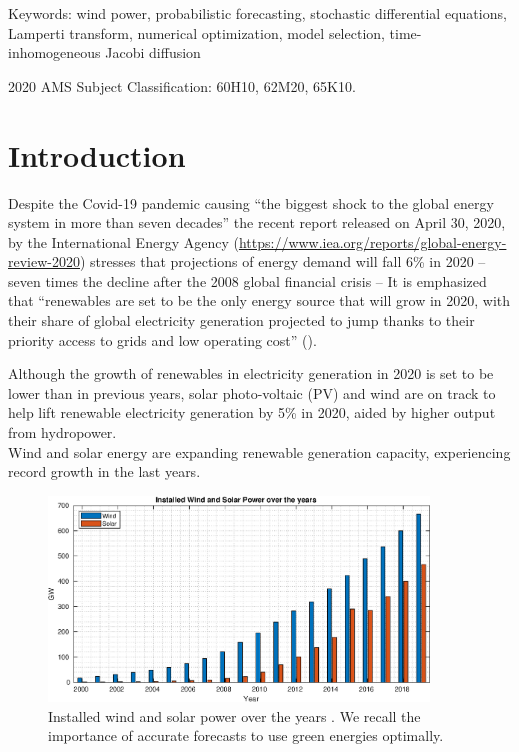 \documentclass[11pt]{article}
\theoremstyle{definition}
\begin{document}
Keywords: wind power, probabilistic forecasting, stochastic differential equations, Lamperti transform, numerical optimization, model selection, time-inhomogeneous Jacobi diffusion

2020 AMS Subject Classification: 60H10, 62M20, 65K10.



\section{Introduction}  \label{Section_1}

Despite the Covid-19 pandemic causing ``the biggest shock to the global energy system in more than seven decades'' the recent report released on April 30, 2020, by the International Energy Agency (\url{https://www.iea.org/reports/global-energy-review-2020}) stresses that projections of energy demand will fall 6\% in 2020 -- seven times the decline after the 2008 global financial crisis -- It is emphasized that ``renewables are set to be the only energy source that will grow in 2020, with their share of global electricity generation projected to jump thanks to their priority access to grids and low operating cost'' (\cite{IEA}). 

Although the growth of renewables in electricity generation in 2020 is set to be lower than in previous years,  solar photo-voltaic (PV) and wind are on track to help lift renewable electricity generation by 5\% in 2020, aided by higher output from hydropower. \\

Wind and solar energy are expanding renewable generation capacity, experiencing record growth in the last years.

\begin{figure}[H]
\centering
\includegraphics[width=0.9\textwidth]{plots/wind_and_solar/plot_over_years.eps}
\caption{Installed wind and solar power over the years \cite{sultana2017review}. We recall the importance of accurate forecasts to use green energies optimally.}
\end{figure}
\end{document}
